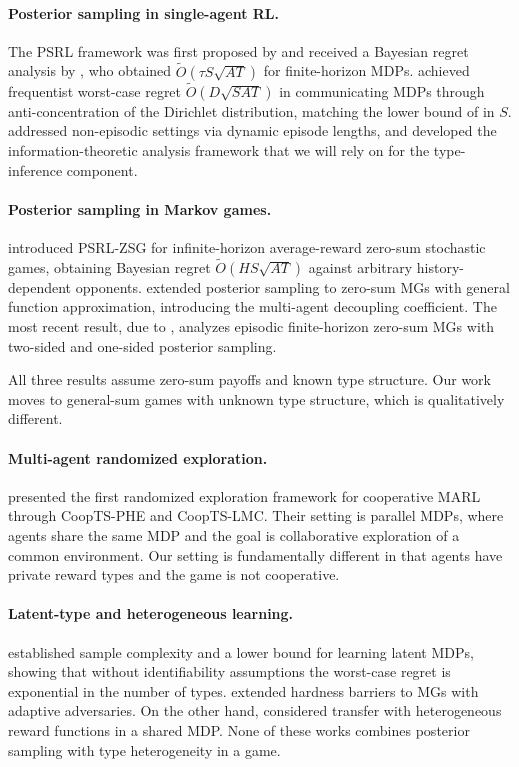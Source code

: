 \documentclass{article}
\begin{document}
\paragraph{Posterior sampling in single-agent RL.}
The PSRL framework was first proposed by \citet{strens2000bayesian} and received a Bayesian regret analysis by \citet{osband2013more}, who obtained $\tilde{O}(\tau S\sqrt{AT})$ for finite-horizon MDPs. \citet{agrawal2017optimistic} achieved frequentist worst-case regret $\tilde{O}(D\sqrt{SAT})$ in communicating MDPs through anti-concentration of the Dirichlet distribution, matching the lower bound of \citet{jaksch2010near} in $S$. \citet{ouyang2017learning} addressed non-episodic settings via dynamic episode lengths, and \citet{russo2014learning} developed the information-theoretic analysis framework that we will rely on for the type-inference component.

\paragraph{Posterior sampling in Markov games.}
\citet{jafarnia2021learning} introduced PSRL-ZSG for infinite-horizon average-reward zero-sum stochastic games, obtaining Bayesian regret $\tilde{O}(HS\sqrt{AT})$ against arbitrary history-dependent opponents. \citet{xiong2022self} extended posterior sampling to zero-sum MGs with general function approximation, introducing the multi-agent decoupling coefficient. The most recent result, due to \citet{yueh2026bayesian}, analyzes episodic finite-horizon zero-sum MGs with two-sided and one-sided posterior sampling.

All three results assume zero-sum payoffs and known type structure. Our work moves to general-sum games with unknown type structure, which is qualitatively different.

\paragraph{Multi-agent randomized exploration.}
\citet{hsu2024randomized} presented the first randomized exploration framework for cooperative MARL through CoopTS-PHE and CoopTS-LMC. Their setting is parallel MDPs, where agents share the same MDP and the goal is collaborative exploration of a common environment. Our setting is fundamentally different in that agents have private reward types and the game is not cooperative.

\paragraph{Latent-type and heterogeneous learning.}
\citet{kwon2021rl} established sample complexity and a lower bound for learning latent MDPs, showing that without identifiability assumptions the worst-case regret is exponential in the number of types. \citet{tian2024learning} extended hardness barriers to MGs with adaptive adversaries. On the other hand, \citet{tuynman2022transfer} considered transfer with heterogeneous reward functions in a shared MDP. None of these works combines posterior sampling with type heterogeneity in a game.
\end{document}
